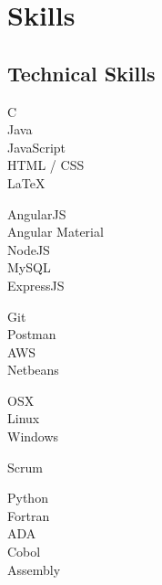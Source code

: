 \documentclass[letterpaper]{deedy-resume} %
\begin{document}
\begin{minipage}[t]{0.25\textwidth} %


\section{Skills}

\subsection{Technical Skills}

\textbullet{} C\\ 
\textbullet{} Java\\  
\textbullet{} JavaScript \\
\textbullet{} HTML / CSS\\
\textbullet{} LaTeX\ \\ 
\sectionspace %

\textbullet{}  AngularJS\\
\textbullet{}  Angular Material\\
\textbullet{} NodeJS\\
\textbullet{} MySQL\\
\textbullet{} ExpressJS \\ 
\sectionspace %

\textbullet{} Git\\
\textbullet{} Postman\\
\textbullet{} AWS\\ 
\textbullet{} Netbeans\\
\sectionspace %

\textbullet{} OSX\\ 
\textbullet{} Linux \\
\textbullet{} Windows\\
\sectionspace %

\textbullet{} Scrum\\
\sectionspace %


\textbullet{} Python\\ 
\textbullet{} Fortran\\ 
\textbullet{} ADA\\ 
\textbullet{} Cobol \\ 
\textbullet{} Assembly\\


\end{minipage}
\end{document}
